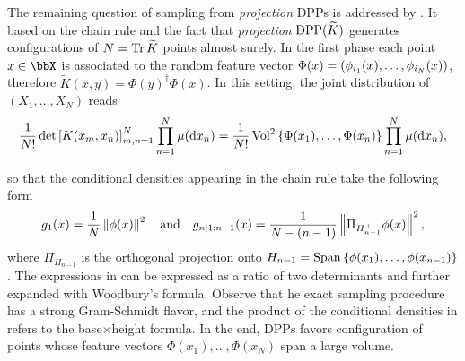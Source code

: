 \documentclass[twoside,11pt]{article}
\begin{document}
      The remaining question of sampling from \textit{projection} DPPs is addressed by \citet[Algorithm 18]{HKPV06}.
      It based on the chain rule and the fact that \textit{projection} $\operatorname{DPP}(\widetilde{K})$ generates configurations of $N=\operatorname{Tr} \widetilde{K}$ points almost surely.
      In the first phase each point $x\in \bbX$ is associated to the random feature vector $\Phi(x)=\left( \phi_{i_1}(x),\dots,\phi_{i_N}(x) \right)$, therefore $\tilde{K}(x,y) = \Phi(y)^{\dagger} \Phi(x)$.
      In this setting, the joint distribution of $(X_1,\dots,X_N)$ reads
      \begin{equation}
      \label{eq:joint_distribution}
        \frac{1}{N!} \det \left[ K(x_m,x_n) \right]_{m,n=1}^N \prod_{n=1}^N\mu(\mathop{}\!\mathrm{d} x_n)
          = \frac{1}{N!} \operatorname{Vol}^2\left\{ \Phi(x_1),\dots,\Phi(x_n) \right\} \prod_{n=1}^N\mu(\mathop{}\!\mathrm{d} x_n),
      \end{equation}

      so that the conditional densities appearing in the chain rule take the following form
      \begin{equation}
      \label{eq:conditionals_densities}
        g_1(x)
          = \frac{1}{N} \left\| \phi(x) \right\|^2
          \quad\text{and}\quad
        g_{n | 1:n-1}(x)
          = \frac{1}{N-(n-1)} \left\|  \Pi_{H_{n-1}^{\perp}} \phi(x) \right\|^2,
      \end{equation}
      where $\Pi_{H_{n-1}}$ is the orthogonal projection onto
      $H_{n-1} = \operatorname{Span}\left\{ \phi(x_1), \dots, \phi(x_{n-1})  \right\}$.
      The expressions in  can be expressed as a ratio of two determinants and further expanded with Woodbury's formula.
      Observe that he exact sampling procedure has a strong Gram-Schmidt flavor, and the product of the conditional densities in  refers to the base$\times$height formula.
      In the end, DPPs favors configuration of points whose feature vectors $\Phi(x_1),\dots, \Phi(x_N)$ span a large volume.\\
\end{document}
